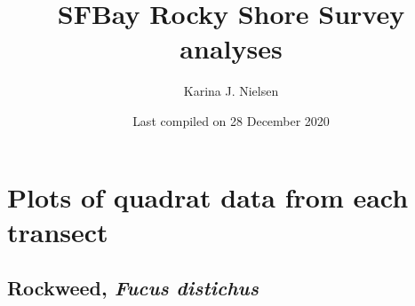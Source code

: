 \documentclass[
]{article}
\title{SFBay Rocky Shore Survey analyses}
\author{Karina J. Nielsen}
\date{Last compiled on 28 December 2020}
\begin{document}
\maketitle

\hypertarget{anchor}{%
\section{Plots of quadrat data from each transect}\label{anchor}}

\hypertarget{rockweed-fucus-distichus}{%
\subsection{\texorpdfstring{Rockweed, \emph{Fucus
distichus}}{Rockweed, Fucus distichus}}\label{rockweed-fucus-distichus}}
\end{document}

